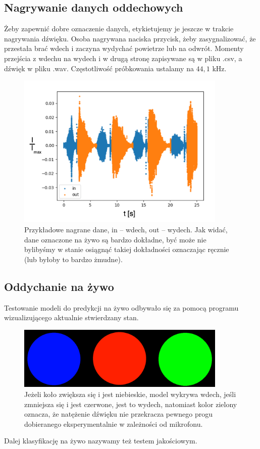 \documentclass[polish]{article}
\begin{document}
\subsection{Nagrywanie danych oddechowych}
Żeby zapewnić dobre oznaczenie danych, etykietujemy je jeszcze w trakcie nagrywania dźwięku. 
Osoba nagrywana naciska przycisk, żeby zasygnalizować, że przestała brać wdech i zaczyna wydychać 
powietrze lub na odwrót. Momenty przejścia z wdechu na wydech i w drugą stronę zapisywane są w pliku
.csv, a dźwięk w pliku .wav. Częstotliwość próbkowania ustalamy na $44,1$ kHz.
\begin{figure}[H]
	\centering
	\includegraphics[width=10cm]{nagrywanie_ozn}
	\caption{Przykładowe nagrane dane, in -- wdech, out -- wydech. Jak widać, dane oznaczone na żywo są bardzo dokładne, być może nie bylibyśmy w stanie osiągnąć takiej dokładności oznaczając ręcznie (lub byłoby to bardzo żmudne).}
\end{figure}
\subsection{Oddychanie na żywo}
Testowanie modeli do predykcji na żywo odbywało się za pomocą programu wizualizującego aktualnie
stwierdzany stan. 
\begin{figure}[H]
	\centering
	\includegraphics[width=10cm]{wdechwydechcisza}
	\caption{Jeżeli koło zwiększa się i jest niebieskie, model wykrywa wdech, jeśli zmniejsza się i jest czerwone, jest to wydech, natomiast kolor zielony oznacza, że natężenie dźwięku nie przekracza pewnego  progu dobieranego eksperymentalnie w zależności od mikrofonu.}
\end{figure}
Dalej klasyfikację na żywo nazywamy też testem jakościowym.
\end{document}
